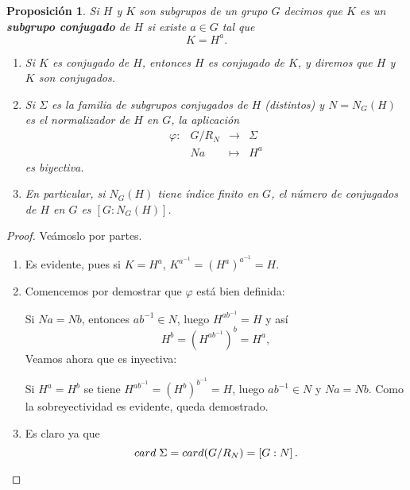\documentclass[12pt]{article}
\newtheorem{proposition}[theorem]{Proposición}
\begin{document}
\begin{proposition}Si $H$ y $K$ son subgrupos de un grupo $G$ decimos que $K$ es un \textbf{subgrupo conjugado} de $H$ si existe $a \in G$ tal que $$K = H^a.$$
\begin{enumerate}
\item Si $K$ es conjugado de $H$, entonces $H$ es conjugado de $K$, y diremos que $H$ y $K$ son \textit{conjugados}.
\item Si $\Sigma$ es la familia de subgrupos conjugados de $H$ (distintos) y $N = N_{G}(H)$ es el normalizador de $H$ en $G$, la aplicación $$
\begin{array}{rccl}
\varphi \colon &G/R_{N} & \longrightarrow & \Sigma\\
&Na & \longmapsto &H^{a}
\end{array}
$$ es biyectiva.
\item En particular, si $N_{G}(H)$ tiene índice finito en $G$, el número de conjugados de $H$ en $G$ es $\left[ G:N_{G}(H) \right]$.
\end{enumerate}
\end{proposition}
\begin{proof}Veámoslo por partes.
\begin{enumerate}
\item Es evidente, pues si $K = H^{a}$, $K^{a^{-1}} =(H^{a})^{a^{-1}} = H$.
\item Comencemos por demostrar que $\varphi$ está bien definida:

Si $Na = Nb$, entonces $ab^{-1} \in N$, luego $H^{ab^{-1}} = H$ y así $$H^{b} = (H^{ab^{-1}})^{b} = H^{a},$$ Veamos ahora que es inyectiva: 

Si $H^{a} = H^{b}$ se tiene $H^{ab^{-1}} = (H^{b})^{b^{-1}} = H$, luego $ab^{-1} \in N$ y $Na = Nb.$ Como la sobreyectividad es evidente, queda demostrado.
\item  Es claro ya que $$card\hspace{0.1cm} \Sigma = card(G/R_{N}) = \left[ G:N \right].$$
\end{enumerate}

\end{proof}
\end{document}
